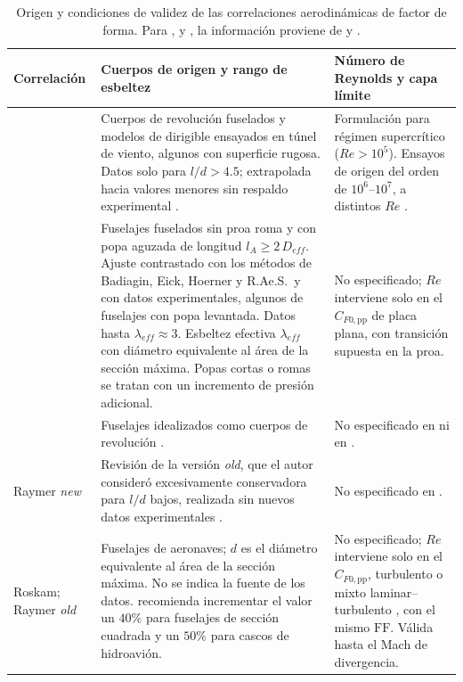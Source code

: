\begin{table}[htpb]
\centering
\caption{Origen y condiciones de validez de las correlaciones aerodinámicas
de factor de forma. Para \citet{hoerner1965drag},
\citet{shevell1989fundamentals} y \citet{raymer2019aircraft}, la información
proviene de \citet{gotten2021form} y \citet{gur2010drag}.}
\label{tab:aero_origen}
\footnotesize
\begin{tabularx}{\textwidth}{>{\raggedright\arraybackslash}p{2.3cm}
                             >{\raggedright\arraybackslash}X
                             >{\raggedright\arraybackslash}X}
\toprule
\textbf{Correlación} & \textbf{Cuerpos de origen y rango de esbeltez} &
\textbf{Número de Reynolds y capa límite} \\
\midrule
\citet{hoerner1965drag} &
Cuerpos de revolución fuselados y modelos de dirigible ensayados en túnel de
viento, algunos con superficie rugosa. Datos solo para $l/d > 4{.}5$;
extrapolada hacia valores menores sin respaldo experimental
\citep{gotten2021form}. &
Formulación para régimen supercrítico ($Re > 10^5$). Ensayos de origen del
orden de $10^6$--$10^7$, a distintos $Re$ \citep{gotten2021form}. \\[4pt]

\citet{torenbeek2010synthesis} &
Fuselajes fuselados sin proa roma y con popa aguzada de longitud
$l_A \geq 2\,D_{eff}$. Ajuste contrastado con los métodos de Badiagin, Eick,
Hoerner y R.Ae.S.\ y con datos experimentales, algunos de fuselajes con popa
levantada. Datos hasta $\lambda_{eff} \approx 3$. Esbeltez efectiva
$\lambda_{eff}$ con diámetro equivalente al área de la sección máxima. Popas
cortas o romas se tratan con un incremento de presión adicional. &
No especificado; $Re$ interviene solo en el $C_{F0,\mathrm{pp}}$ de placa plana, con
transición supuesta en la proa. \\[4pt]

\citet{shevell1989fundamentals} &
Fuselajes idealizados como cuerpos de revolución \citep{gur2010drag}. &
No especificado en \citet{gur2010drag} ni en \citet{gotten2021form}. \\[4pt]

Raymer \textit{new} \citep{raymer2019aircraft} &
Revisión de la versión \textit{old}, que el autor consideró excesivamente
conservadora para $l/d$ bajos, realizada sin nuevos datos experimentales
\citep{gotten2021form}. &
No especificado en \citet{gotten2021form}. \\[4pt]

Roskam; Raymer \textit{old} \citep{roskam1987airplane, raymer1992aircraft} &
Fuselajes de aeronaves; $d$ es el diámetro equivalente al área de la sección
máxima. No se indica la fuente de los datos. \citet{raymer1992aircraft}
recomienda incrementar el valor un $40\%$ para fuselajes de sección cuadrada
y un $50\%$ para cascos de hidroavión. &
No especificado; $Re$ interviene solo en el $C_{F0,\mathrm{pp}}$, turbulento
\citep{roskam1987airplane} o mixto laminar--turbulento
\citep{raymer1992aircraft}, con el mismo $\mathrm{FF}$. Válida hasta el Mach
de divergencia. \\[4pt]


\end{tabularx}
\end{table}
